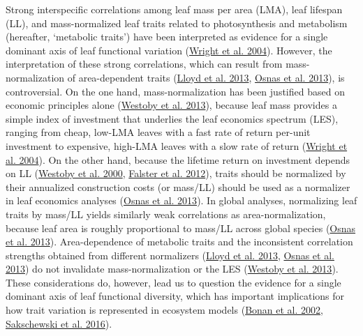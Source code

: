 \documentclass[
  12pt,
  letterpaper,
  DIV=11,
  numbers=noendperiod]{scrartcl}
\begin{document}
Strong interspecific correlations among leaf mass per area (LMA), leaf
lifespan (LL), and mass-normalized leaf traits related to photosynthesis
and metabolism (hereafter, `metabolic traits') have been interpreted as
evidence for a single dominant axis of leaf functional variation
(\protect\hyperlink{ref-Wright2004a}{Wright et al. 2004}). However, the
interpretation of these strong correlations, which can result from
mass-normalization of area-dependent traits
(\protect\hyperlink{ref-Lloyd2013}{Lloyd et al. 2013},
\protect\hyperlink{ref-Osnas2013}{Osnas et al. 2013}), is controversial.
On the one hand, mass-normalization has been justified based on economic
principles alone (\protect\hyperlink{ref-Westoby2013}{Westoby et al.
2013}), because leaf mass provides a simple index of investment that
underlies the leaf economics spectrum (LES), ranging from cheap, low-LMA
leaves with a fast rate of return per-unit investment to expensive,
high-LMA leaves with a slow rate of return
(\protect\hyperlink{ref-Wright2004a}{Wright et al. 2004}). On the other
hand, because the lifetime return on investment depends on LL
(\protect\hyperlink{ref-Westoby2000}{Westoby et al. 2000},
\protect\hyperlink{ref-Falster2012}{Falster et al. 2012}), traits should
be normalized by their annualized construction costs (or mass/LL) should
be used as a normalizer in leaf economics analyses
(\protect\hyperlink{ref-Osnas2013}{Osnas et al. 2013}). In global
analyses, normalizing leaf traits by mass/LL yields similarly weak
correlations as area-normalization, because leaf area is roughly
proportional to mass/LL across global species
(\protect\hyperlink{ref-Osnas2013}{Osnas et al. 2013}). Area-dependence
of metabolic traits and the inconsistent correlation strengths obtained
from different normalizers (\protect\hyperlink{ref-Lloyd2013}{Lloyd et
al. 2013}, \protect\hyperlink{ref-Osnas2013}{Osnas et al. 2013}) do not
invalidate mass-normalization or the LES
(\protect\hyperlink{ref-Westoby2013}{Westoby et al. 2013}). These
considerations do, however, lead us to question the evidence for a
single dominant axis of leaf functional diversity, which has important
implications for how trait variation is represented in ecosystem models
(\protect\hyperlink{ref-Bonan2002}{Bonan et al. 2002},
\protect\hyperlink{ref-Sakschewski2016}{Sakschewski et al. 2016}).
\end{document}
